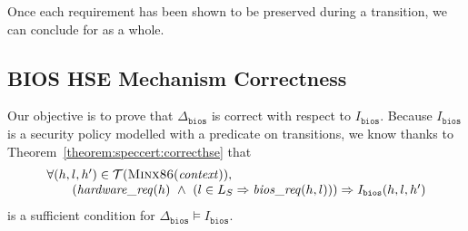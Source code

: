 %
Once each requirement has been shown to be preserved during a transition, we can
conclude for  as a whole.

\subsection{BIOS HSE Mechanism Correctness}
\label{subsec:speccert2:bioshsecorrect}

Our objective is to prove that \( \Delta_{\mathtt{bios}} \) is correct with
respect to \( I_{\mathtt{bios}} \).
%
Because \( I_{\mathtt{bios}} \) is a security policy modelled with a predicate
on transitions, we know thanks to Theorem~\ref{theorem:speccert:correcthse} that
%
\[
  \begin{array}{l}
    \forall (h, l, h') \in \mathcal{T}(\textsc{Minx86}(\mathit{context})), \\
    \qquad (\mathit{hardware\_req}(h)\ \wedge\ (l \in L_S \Rightarrow
    \mathit{bios\_req}(h, l))) \Rightarrow I_{\mathtt{bios}}(h, l, h')
  \end{array}
\]
%
is a sufficient condition for
\( \Delta_{\mathtt{bios}} \models I_{\mathtt{bios}} \).

